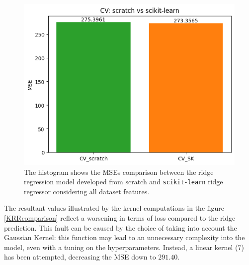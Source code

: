 \documentclass{article}
\begin{document}
    
\begin{figure}[H]
	\begin{adjustwidth}{0 cm}{}
		\begin{center}
			\includegraphics[scale= 0.53]{images/finalCV.png}
		\end{center}
	\end{adjustwidth}
	\caption{The histogram shows the MSEs comparison between the ridge regression model developed from scratch and \texttt{scikit-learn} ridge regressor considering all dataset features.}
	\label{CVscrsk}
\end{figure}
The resultant values illustrated by the kernel computations in the figure \ref{KRRcomparison} reflect a worsening in terms of loss compared to the ridge prediction. This fault can be caused by the choice of taking into account the Gaussian Kernel: this function may lead to an unnecessary complexity into the model, even with a tuning on the hyperparameters. Instead, a linear kernel (7) has been attempted, decreasing the MSE down to $291.40$. 
\end{document}
